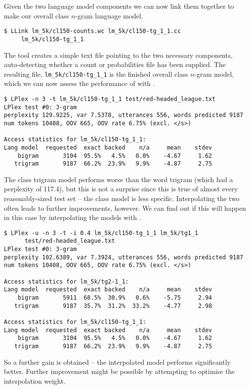 Given the two language model components we can now link them together
to make our overall class $n$-gram language model.
\begin{verbatim}
$ LLink lm_5k/cl150-counts.wc lm_5k/cl150-tg_1_1.cc
     lm_5k/cl150-tg_1_1
\end{verbatim} %

The  tool creates a simple text file pointing to the two
necessary components, auto-detecting whether a count or probabilities
file has been supplied.  The resulting file, {\tt lm\_5k/cl150-tg\_1\_1}
is the finished overall class $n$-gram model, which we can now assess
the performance of with .
\begin{verbatim}
$ LPlex -n 3 -t lm_5k/cl150-tg_1_1 test/red-headed_league.txt
LPlex test #0: 3-gram
perplexity 129.9225, var 7.5378, utterances 556, words predicted 9187
num tokens 10408, OOV 665, OOV rate 6.75% (excl. </s>)
 
Access statistics for lm_5k/cl150-tg_1_1:
Lang model  requested  exact backed    n/a     mean    stdev
    bigram       3104  95.5%   4.5%   0.0%    -4.67     1.62
   trigram       9187  66.2%  23.9%   9.9%    -4.87     2.75
\end{verbatim} %

The class trigram model performs worse than the word trigram (which
had a perplexity of 117.4), but this is not a surprise since this is
true of almost every reasonably-sized test set -- the class model is
less specific.  Interpolating the two often leads to further
improvements, however.  We can find out if this will happen in this
case by interpolating the models with .
\begin{verbatim}
$ LPlex -u -n 3 -t -i 0.4 lm_5k/cl150-tg_1_1 lm_5k/tg1_1
      test/red-headed_league.txt
LPlex test #0: 3-gram
perplexity 102.6389, var 7.3924, utterances 556, words predicted 9187
num tokens 10408, OOV 665, OOV rate 6.75% (excl. </s>)
 
Access statistics for lm_5k/tg2-1_1:
Lang model  requested  exact backed    n/a     mean    stdev
    bigram       5911  68.5%  30.9%   0.6%    -5.75     2.94
   trigram       9187  35.7%  31.2%  33.2%    -4.77     2.98
 
Access statistics for lm_5k/cl150-tg_1_1:
Lang model  requested  exact backed    n/a     mean    stdev
    bigram       3104  95.5%   4.5%   0.0%    -4.67     1.62
   trigram       9187  66.2%  23.9%   9.9%    -4.87     2.75
\end{verbatim} %
So a further gain is obtained -- the interpolated model performs
significantly better.  Further improvement might be possible by
attempting to optimise the interpolation weight.

